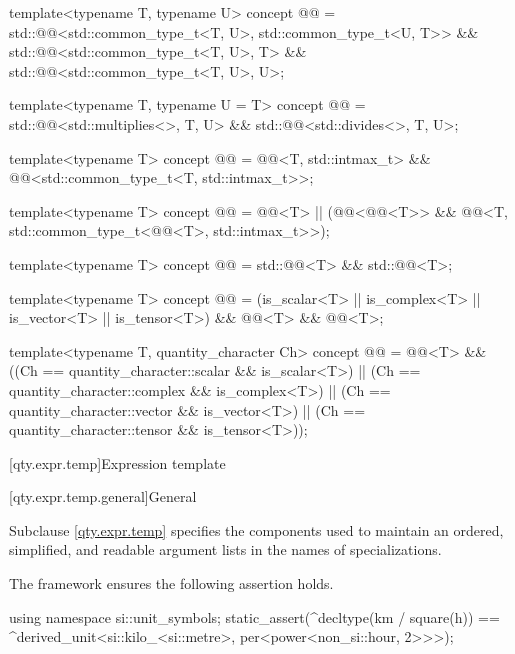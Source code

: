 \begin{itemdecl}
template<typename T, typename U>
concept @@ = std::@@<std::common_type_t<T, U>, std::common_type_t<U, T>> &&
                         std::@@<std::common_type_t<T, U>, T> &&
                         std::@@<std::common_type_t<T, U>, U>;

template<typename T, typename U = T>
concept @@ = std::@@<std::multiplies<>, T, U> &&
                         std::@@<std::divides<>, T, U>;

template<typename T>
concept @@ =
  @@<T, std::intmax_t> && @@<std::common_type_t<T, std::intmax_t>>;

template<typename T>
concept @@ =
  @@<T> ||
  (@@<@@<T>> &&
   @@<T, std::common_type_t<@@<T>, std::intmax_t>>);

template<typename T>
concept @@ = std::@@<T> && std::@@<T>;

template<typename T>
concept @@ = (is_scalar<T> || is_complex<T> || is_vector<T> || is_tensor<T>) &&
                         @@<T> && @@<T>;

template<typename T, quantity_character Ch>
concept @@ =
  @@<T> && ((Ch == quantity_character::scalar && is_scalar<T>) ||
                        (Ch == quantity_character::complex && is_complex<T>) ||
                        (Ch == quantity_character::vector && is_vector<T>) ||
                        (Ch == quantity_character::tensor && is_tensor<T>));
\end{itemdecl}

[qty.expr.temp]{Expression template}

[qty.expr.temp.general]{General}

\pnum
Subclause \ref{qty.expr.temp} specifies the components
used to maintain an ordered, simplified, and readable
argument lists in the names of specializations.
\begin{example}
The framework ensures the following assertion holds.
\begin{codeblock}
using namespace si::unit_symbols;
static_assert(^decltype(km / square(h)) ==
              ^derived_unit<si::kilo_<si::metre>, per<power<non_si::hour, 2>>>);
\end{codeblock}
\end{example}

